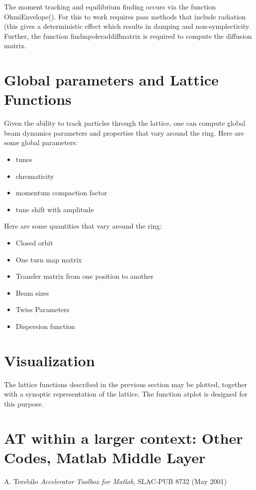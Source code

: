 \documentclass[acus]{article}
\begin{document}
The moment tracking and equilibrium finding occurs via the function OhmiEnvelope().  For this to work requires pass methods that include radiation (this gives a deterministic effect which results in damping and non-symplecticity.  Further, the function findmpoleraddiffmatrix is required to compute the diffusion matrix.

\section{Global parameters and Lattice Functions}
Given the ability to track particles through the lattice, one can compute global beam dynamics parameters and properties that vary around the ring.  
Here are some global parameters:
\begin{itemize}
\item tunes
\item chromaticity
\item momentum compaction factor
\item tune shift with amplitude
\end{itemize}

Here are some quantities that vary around the ring:
\begin{itemize}
\item Closed orbit
\item One turn map matrix
\item Transfer matrix from one position to another
\item Beam sizes
\item Twiss Parameters
\item Dispersion function
\end{itemize}


\section{Visualization}
The lattice functions described in the previous section may be plotted, together with a synoptic representation of the lattice.  The function atplot is designed for this purpose.

\section{AT within a larger context: Other Codes, Matlab Middle Layer}

\begin{thebibliography}{2}

A. Terebilo \emph{Accelerator Toolbox for Matlab}, SLAC-PUB 8732 (May 2001)

\end{thebibliography}
\end{document}
